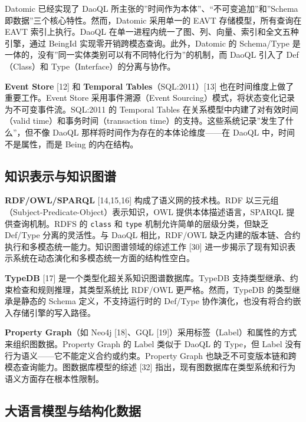 \documentclass[11pt,a4paper]{ctexart}
\begin{document}
Datomic 已经实现了 DaoQL
所主张的''时间作为本体''、``不可变追加''和''Schema
即数据''三个核心特性。然而，Datomic 采用单一的 EAVT 存储模型，所有查询在
EAVT 索引上执行。DaoQL
在单一进程内统一了图、列、向量、索引和全文五种引擎，通过 BeingId
实现零开销跨模态查询。此外，Datomic 的 Schema/Type
是一体的，没有''同一实体类别可以有不同特化行为''的机制，而 DaoQL 引入了
Def（Class）和 Type（Interface）的分离与协作。

\textbf{Event Store} {[}12{]} 和 \textbf{Temporal
Tables}（SQL:2011）{[}13{]} 也在时间维度上做了重要工作。Event Store
采用事件溯源（Event
Sourcing）模式，将状态变化记录为不可变事件流。SQL:2011 的 Temporal
Tables 在关系模型中内建了对有效时间（valid time）和事务时间（transaction
time）的支持。这些系统记录''发生了什么''，但不像 DaoQL
那样将时间作为存在的本体论维度------在 DaoQL 中，时间不是属性，而是
Being 的内在结构。

\subsection{知识表示与知识图谱}\label{ux77e5ux8bc6ux8868ux793aux4e0eux77e5ux8bc6ux56feux8c31}

\textbf{RDF/OWL/SPARQL} {[}14,15,16{]} 构成了语义网的技术栈。RDF
以三元组（Subject-Predicate-Object）表示知识，OWL
提供本体描述语言，SPARQL 提供查询机制。RDFS 的 \texttt{class} 和
\texttt{type} 机制允许简单的层级分类，但缺乏 Def/Type 分离的灵活性。与
DaoQL 相比，RDF/OWL
缺乏内建的版本链、合约执行和多模态统一能力。知识图谱领域的综述工作
{[}30{]}
进一步揭示了现有知识表示系统在动态演化和多模态统一方面的结构性空白。

\textbf{TypeDB} {[}17{]} 是一个类型化超关系知识图谱数据库。TypeDB
支持类型继承、约束检查和规则推理，其类型系统比 RDF/OWL
更严格。然而，TypeDB 的类型继承是静态的 Schema 定义，不支持运行时的
Def/Type 协作演化，也没有将合约嵌入存储引擎的写入路径。

\textbf{Property Graph}（如 Neo4j {[}18{]}、GQL
{[}19{]}）采用标签（Label）和属性的方式来组织图数据。Property Graph 的
Label 类似于 DaoQL 的 Type，但 Label
没有行为语义------它不能定义合约或约束。Property Graph
也缺乏不可变版本链和跨模态查询能力。图数据库模型的综述 {[}32{]}
指出，现有图数据库在类型系统和行为语义方面存在根本性限制。

\subsection{大语言模型与结构化数据}\label{ux5927ux8bedux8a00ux6a21ux578bux4e0eux7ed3ux6784ux5316ux6570ux636e}
\end{document}
